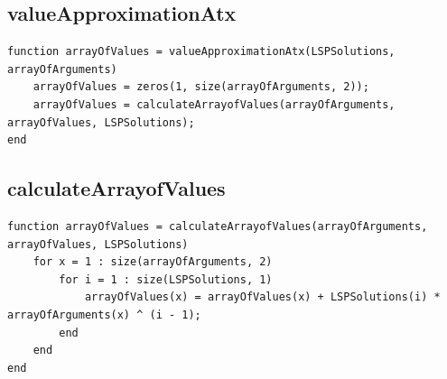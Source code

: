 \subsection{valueApproximationAtx}
\begin{simplechar}
\begin{lstlisting}
function arrayOfValues = valueApproximationAtx(LSPSolutions, arrayOfArguments)
    arrayOfValues = zeros(1, size(arrayOfArguments, 2));
    arrayOfValues = calculateArrayofValues(arrayOfArguments, arrayOfValues, LSPSolutions);
end
\end{lstlisting}
\end{simplechar}

\subsection{calculateArrayofValues}
\begin{simplechar}
\begin{lstlisting}
function arrayOfValues = calculateArrayofValues(arrayOfArguments, arrayOfValues, LSPSolutions)
    for x = 1 : size(arrayOfArguments, 2)
        for i = 1 : size(LSPSolutions, 1)
            arrayOfValues(x) = arrayOfValues(x) + LSPSolutions(i) * arrayOfArguments(x) ^ (i - 1);
        end
    end
end
\end{lstlisting}
\end{simplechar}

